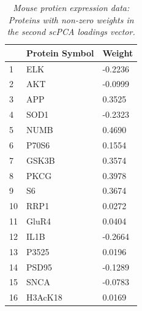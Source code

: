 \newpage
\begin{longtable}{| l | p{4cm} | l |}
  \caption{{\em Mouse protien expression data: Proteins with non-zero weights in the second scPCA loadings vector.}}
  \label{tab:mouse_prot_2} \\
  \hline
 & Protein Symbol & Weight \\ 
 \hline
  1 & ELK & -0.2236 \\ 
  2 & AKT & -0.0999 \\ 
  3 & APP & 0.3525 \\ 
  4 & SOD1 & -0.2323 \\ 
  5 & NUMB & 0.4690 \\ 
  6 & P70S6 & 0.1554 \\ 
  7 & GSK3B & 0.3574 \\ 
  8 & PKCG & 0.3978 \\ 
  9 & S6 & 0.3674 \\ 
  10 & RRP1 & 0.0272 \\ 
  11 & GluR4 & 0.0404 \\ 
  12 & IL1B & -0.2664 \\ 
  13 & P3525 & 0.0196 \\ 
  14 & PSD95 & -0.1289 \\ 
  15 & SNCA & -0.0783 \\ 
  16 & H3AcK18 & 0.0169 \\ 
 \hline
 \end{longtable}
 